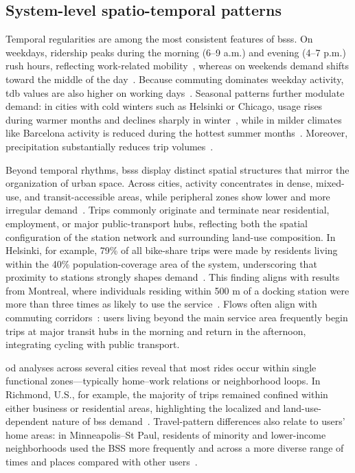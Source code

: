     \subsection{System-level spatio-temporal patterns}

    Temporal regularities are among the most consistent features of \acp{bss}. On weekdays, ridership peaks during the morning (6–9 a.m.) and evening (4–7 p.m.) rush hours, reflecting work-related mobility~\cite{Fishman2016, Zhao2015}, whereas on weekends demand shifts toward the middle of the day~\cite{Fishman2016, CortezOrdonez2024}. Because commuting dominates weekday activity, \ac{tdb} values are also higher on working days~\cite{FaghihImani2014, ElAssi2017}. Seasonal patterns further modulate demand: in cities with cold winters such as Helsinki or Chicago, usage rises during warmer months and declines sharply in winter~\cite{Willberg2021, Zhou2015, Wang2021}, while in milder climates like Barcelona activity is reduced during the hottest summer months~\cite{CortezOrdonez2024}. Moreover, precipitation substantially reduces trip volumes~\cite{Wang2021}.

    Beyond temporal rhythms, \acp{bss} display distinct spatial structures that mirror the organization of urban space. Across cities, activity concentrates in dense, mixed-use, and transit-accessible areas, while peripheral zones show lower and more irregular demand~\cite{FaghihImani2017, Willberg2021}. Trips commonly originate and terminate near residential, employment, or major public-transport hubs, reflecting both the spatial configuration of the station network and surrounding land-use composition. In Helsinki, for example, 79\% of all bike-share trips were made by residents living within the 40\% population-coverage area of the system, underscoring that proximity to stations strongly shapes demand~\cite{Willberg2021}. This finding aligns with results from Montreal, where individuals residing within 500 m of a docking station were more than three times as likely to use the service~\cite{BachandMarleau2012}. Flows often align with commuting corridors~\cite{Willberg2021}: users living beyond the main service area frequently begin trips at major transit hubs in the morning and return in the afternoon, integrating cycling with public transport.

    \ac{od} analyses across several cities reveal that most rides occur within single functional zones—typically home–work relations or neighborhood loops. In Richmond, U.S., for example, the majority of trips remained confined within either business or residential areas, highlighting the localized and land-use-dependent nature of \ac{bss} demand~\cite{Yang2024}. Travel-pattern differences also relate to users’ home areas: in Minneapolis–St Paul, residents of minority and lower-income neighborhoods used the BSS more frequently and across a more diverse range of times and places compared with other users~\cite{Wang2019}.

